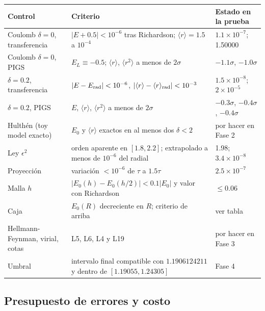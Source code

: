 \documentclass[11pt]{article}
\begin{document}
\begin{longtable}{@{}L{4.2cm}L{5.6cm}L{3.6cm}@{}}
\toprule
\textbf{Control} & \textbf{Criterio} & \textbf{Estado en la prueba}\\
\midrule
\endhead
Coulomb $\delta=0$, transferencia & $|E+0.5|<10^{-6}$ tras Richardson; $\langle r\rangle=1.5$ a $10^{-4}$ & $1.1\times10^{-7}$; 1.50000\\
Coulomb $\delta=0$, PIGS & $E_L\equiv-0.5$; $\langle r\rangle$, $\langle r^2\rangle$ a menos de $2\sigma$ & $-1.1\sigma$, $-1.0\sigma$\\
$\delta=0.2$, transferencia & $|E-E_{\rm rad}|<10^{-6}$, $|\langle r\rangle-\langle r\rangle_{\rm rad}|<10^{-3}$ & $1.5\times10^{-8}$; $2\times10^{-5}$\\
$\delta=0.2$, PIGS & $E$, $\langle r\rangle$, $\langle r^2\rangle$ a menos de $2\sigma$ & $-0.3\sigma$, $-0.4\sigma$, $-0.4\sigma$\\
Hulthén (toy model exacto) & $E_0$ y $\langle r\rangle$ exactos en al menos dos $\delta<2$ & por hacer en Fase 2\\
Ley $\epsilon^2$ & orden aparente en $[1.8,2.2]$; extrapolado a menos de $10^{-6}$ del radial & 1.98; $3.4\times10^{-8}$\\
Proyección & variación $<10^{-6}$ de $\tau$ a $1.5\tau$ & $2.5\times10^{-7}$\\
Malla $h$ & $|E_0(h)-E_0(h/2)|<0.1|E_0|$ y valor con Richardson & $\le0.06$\\
Caja & $E_0(R)$ decreciente en $R$; criterio de arriba & ver tabla\\
Hellmann-Feynman, virial, cotas & L5, L6, L4 y L19 & por hacer en Fase 3\\
Umbral & intervalo final compatible con $1.1906124211$ y dentro de $[1.19055,1.24305]$ & Fase 4\\
\bottomrule
\end{longtable}

\subsection{Presupuesto de errores y costo}
\end{document}
